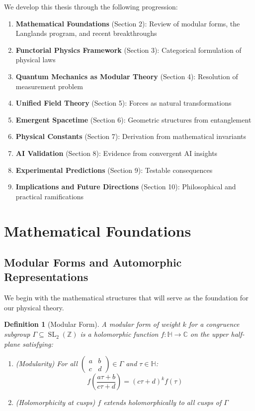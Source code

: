 \documentclass[12pt,a4paper]{article}
\newtheorem{definition}[theorem]{Definition}
\DeclareMathOperator{\SL}{SL}
\begin{document}
We develop this thesis through the following progression:

\begin{enumerate}
\item \textbf{Mathematical Foundations} (Section 2): Review of modular forms, the Langlands program, and recent breakthroughs
\item \textbf{Functorial Physics Framework} (Section 3): Categorical formulation of physical laws
\item \textbf{Quantum Mechanics as Modular Theory} (Section 4): Resolution of measurement problem
\item \textbf{Unified Field Theory} (Section 5): Forces as natural transformations
\item \textbf{Emergent Spacetime} (Section 6): Geometric structures from entanglement
\item \textbf{Physical Constants} (Section 7): Derivation from mathematical invariants
\item \textbf{AI Validation} (Section 8): Evidence from convergent AI insights
\item \textbf{Experimental Predictions} (Section 9): Testable consequences
\item \textbf{Implications and Future Directions} (Section 10): Philosophical and practical ramifications
\end{enumerate}

\section{Mathematical Foundations}

\subsection{Modular Forms and Automorphic Representations}

We begin with the mathematical structures that will serve as the foundation for our physical theory.

\begin{definition}[Modular Form]
A modular form of weight $k$ for a congruence subgroup $\Gamma \subseteq \SL_2(\mathbb{Z})$ is a holomorphic function $f: \mathbb{H} \to \mathbb{C}$ on the upper half-plane satisfying:
\begin{enumerate}
\item (Modularity) For all $\begin{pmatrix} a & b \\ c & d \end{pmatrix} \in \Gamma$ and $\tau \in \mathbb{H}$:
\[
f\left(\frac{a\tau + b}{c\tau + d}\right) = (c\tau + d)^k f(\tau)
\]
\item (Holomorphicity at cusps) $f$ extends holomorphically to all cusps of $\Gamma$
\end{enumerate}
\end{definition}
\end{document}
